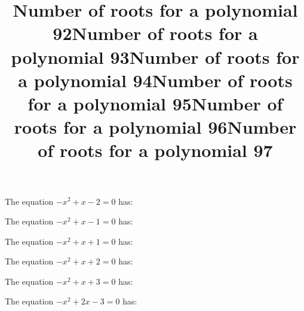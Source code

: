 \documentclass{article}
\begin{document}
\begin{category}
\begin{question}[multichoice]

\end{question}
\begin{question}[multichoice]
\title{Number of roots for a polynomial 92}
The equation $- x^{2} + x - 2=0$ has:


\end{question}
\begin{question}[multichoice]
\title{Number of roots for a polynomial 93}
The equation $- x^{2} + x - 1=0$ has:


\end{question}
\begin{question}[multichoice]
\title{Number of roots for a polynomial 94}
The equation $- x^{2} + x + 1=0$ has:


\end{question}
\begin{question}[multichoice]
\title{Number of roots for a polynomial 95}
The equation $- x^{2} + x + 2=0$ has:


\end{question}
\begin{question}[multichoice]
\title{Number of roots for a polynomial 96}
The equation $- x^{2} + x + 3=0$ has:


\end{question}
\begin{question}[multichoice]
\title{Number of roots for a polynomial 97}
The equation $- x^{2} + 2 x - 3=0$ has:



\end{question}
\end{category}
\end{document}
